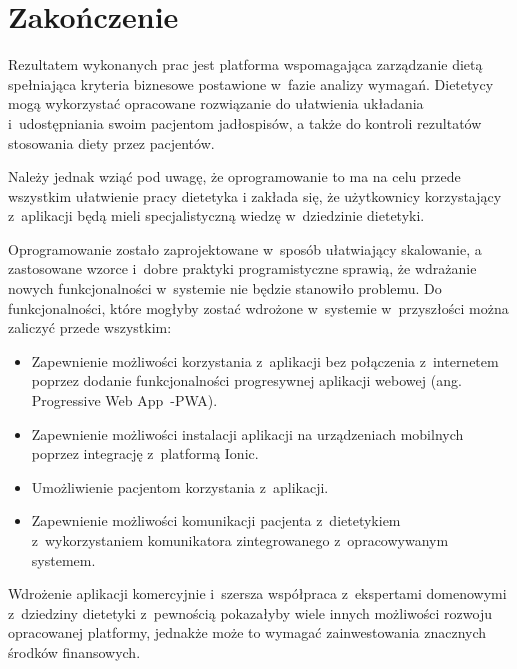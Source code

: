\chapter*{Zakończenie}\label{ch:ending}
Rezultatem wykonanych prac jest platforma wspomagająca zarządzanie dietą spełniająca kryteria biznesowe postawione w~fazie analizy wymagań.
Dietetycy mogą wykorzystać opracowane rozwiązanie do ułatwienia układania i~udostępniania swoim pacjentom jadłospisów,
a także do kontroli rezultatów stosowania diety przez pacjentów.

\par
Należy jednak wziąć pod uwagę, że oprogramowanie to ma na celu przede wszystkim ułatwienie pracy dietetyka
i zakłada się, że użytkownicy korzystający z~aplikacji będą mieli specjalistyczną wiedzę w~dziedzinie dietetyki.

\par
Oprogramowanie zostało zaprojektowane w~sposób ułatwiający skalowanie,
a zastosowane wzorce i~dobre praktyki programistyczne sprawią, że wdrażanie nowych funkcjonalności w~systemie nie będzie stanowiło problemu.
Do funkcjonalności, które mogłyby zostać wdrożone w~systemie w~przyszłości można zaliczyć przede wszystkim:
\begin{itemize}
    \item Zapewnienie możliwości korzystania z~aplikacji bez połączenia z~internetem poprzez dodanie funkcjonalności progresywnej aplikacji webowej (ang. Progressive Web App~-PWA)\cite{url:pwa}.
    \item Zapewnienie możliwości instalacji aplikacji na urządzeniach mobilnych poprzez integrację z~platformą Ionic\cite{tech:ionic}.
    \item Umożliwienie pacjentom korzystania z~aplikacji.
    \item Zapewnienie możliwości komunikacji pacjenta z~dietetykiem z~wykorzystaniem komunikatora zintegrowanego z~opracowywanym systemem.
\end{itemize}

\par
Wdrożenie aplikacji komercyjnie i~szersza współpraca z~ekspertami domenowymi z~dziedziny dietetyki z~pewnością pokazałyby wiele innych możliwości rozwoju opracowanej platformy,
jednakże może to wymagać zainwestowania znacznych środków finansowych.
\thispagestyle{normal}
